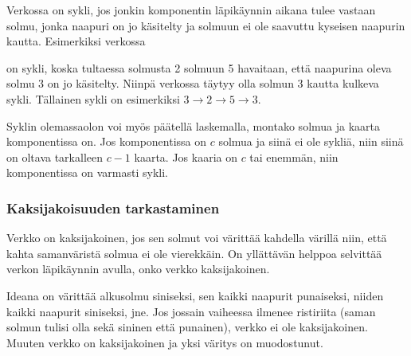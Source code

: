 Verkossa on sykli,
jos jonkin komponentin läpikäynnin
aikana tulee vastaan solmu,
jonka naapuri on jo käsitelty
ja solmuun ei ole saavuttu kyseisen naapurin kautta.
Esimerkiksi verkossa
\begin{center}
\end{center}
on sykli, koska tultaessa solmusta 2 solmuun 5
havaitaan, että naapurina oleva solmu 3 on jo käsitelty.
Niinpä verkossa täytyy olla solmun 3 kautta
kulkeva sykli.
Tällainen sykli on esimerkiksi
$3 \rightarrow 2 \rightarrow 5 \rightarrow 3$.

Syklin olemassaolon voi myös päätellä laskemalla,
montako solmua ja kaarta komponentissa on.
Jos komponentissa on $c$ solmua ja siinä ei ole sykliä,
niin siinä on oltava tarkalleen $c-1$ kaarta.
Jos kaaria on $c$ tai enemmän, niin komponentissa
on varmasti sykli.

\subsubsection{Kaksijakoisuuden tarkastaminen}


Verkko on kaksijakoinen,
jos sen solmut voi värittää
kahdella värillä
niin, että kahta samanväristä
solmua ei ole vierekkäin.
On yllättävän helppoa selvittää
verkon läpikäynnin avulla,
onko verkko kaksijakoinen.

Ideana on värittää alkusolmu
siniseksi, sen kaikki naapurit
punaiseksi, niiden kaikki naapurit
siniseksi, jne.
Jos jossain vaiheessa
ilmenee ristiriita
(saman solmun tulisi olla sekä
sininen että punainen),
verkko ei ole kaksijakoinen.
Muuten verkko on kaksijakoinen
ja yksi väritys on muodostunut.

